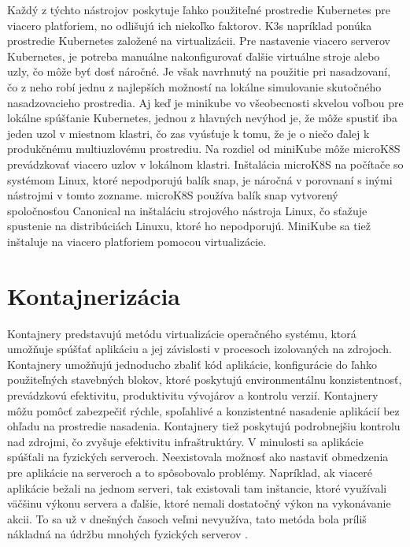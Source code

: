 Každý z týchto nástrojov poskytuje ľahko použiteľné prostredie Kubernetes pre viacero platforiem, no odlišujú ich niekoľko faktorov. K3s napríklad ponúka prostredie Kubernetes založené na virtualizácii. Pre nastavenie viacero serverov Kubernetes, je potreba manuálne nakonfigurovať ďalšie virtuálne stroje alebo uzly, čo môže byť dosť náročné. Je však navrhnutý na použitie pri nasadzovaní, čo z neho robí jednu z najlepších možností na lokálne simulovanie skutočného nasadzovacieho prostredia. Aj keď je minikube vo všeobecnosti skvelou voľbou pre lokálne spúšťanie Kubernetes, jednou z hlavných nevýhod je, že môže spustiť iba jeden uzol v miestnom klastri, čo zas vyúsťuje k tomu, že je o niečo ďalej k produkčnému multiuzlovému prostrediu. Na rozdiel od miniKube môže microK8S prevádzkovať viacero uzlov v lokálnom klastri. Inštalácia microK8S na počítače so systémom Linux, ktoré nepodporujú balík snap, je náročná v porovnaní s inými nástrojmi v tomto zozname. microK8S používa balík snap vytvorený spoločnosťou Canonical na inštaláciu strojového nástroja Linux, čo sťažuje spustenie na distribúciách Linuxu, ktoré ho nepodporujú. MiniKube sa tiež inštaluje na viacero platforiem pomocou virtualizácie.



\section{Kontajnerizácia}

Kontajnery predstavujú metódu virtualizácie operačného systému, ktorá umožňuje spúšťať aplikáciu a jej závislosti v procesoch izolovaných na zdrojoch. Kontajnery umožňujú jednoducho zbaliť kód aplikácie, konfigurácie do ľahko použiteľných stavebných blokov, ktoré poskytujú environmentálnu konzistentnosť, prevádzkovú efektivitu, produktivitu vývojárov a kontrolu verzií. Kontajnery môžu pomôcť zabezpečiť rýchle, spoľahlivé a konzistentné nasadenie aplikácií bez ohľadu na prostredie nasadenia. Kontajnery tiež poskytujú podrobnejšiu kontrolu nad zdrojmi, čo zvyšuje efektivitu infraštruktúry. V minulosti sa aplikácie spúšťali na fyzických serveroch. Neexistovala možnosť ako nastaviť obmedzenia pre aplikácie na serveroch a to spôsobovalo problémy. Napríklad, ak viaceré aplikácie bežali na jednom serveri, tak existovali tam inštancie, ktoré využívali väčšinu výkonu servera a ďalšie, ktoré nemali dostatočný výkon na vykonávanie akcii. To sa už v dnešných časoch veľmi nevyužíva, tato metóda bola príliš nákladná na údržbu mnohých fyzických serverov \cite{container}.


